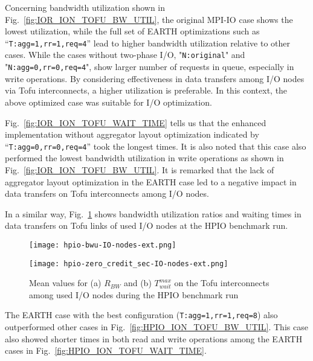 \documentclass{jhps}
\begin{document}
Concerning bandwidth utilization shown in
Fig.~\ref{fig:IOR_ION_TOFU_BW_UTIL},
the original MPI-IO case shows the lowest utilization, while the full set of EARTH 
optimizations such as “{\tt T:agg=1,rr=1,req=4}” lead to higher bandwidth utilization
relative to other cases.
While the cases without two-phase I/O,
"{\tt N:original}" and "{\tt N:agg=0,rr=0,req=4}", show
larger number of requests in queue, especially in write operations.
By considering effectiveness in data transfers among I/O nodes via Tofu interconnects,
a higher utilization is preferable.
In this context, the above optimized case was suitable for I/O optimization.

Fig.~\ref{fig:IOR_ION_TOFU_WAIT_TIME}
tells us that the enhanced implementation
without aggregator layout optimization indicated by “{\tt T:agg=0,rr=0,req=4}”
took the longest times.
It is also noted that this case also performed the lowest bandwidth utilization
in write operations as shown in
Fig.~\ref{fig:IOR_ION_TOFU_BW_UTIL}.
It is remarked that the lack of aggregator layout optimization in the EARTH case
led to a negative impact in data transfers on Tofu interconnects among I/O nodes.

In a similar way, Fig.~\ref{fig:HPIO_ION_TOFU_BWU_WAIT_TIME} shows
bandwidth utilization ratios and waiting times in data transfers
on Tofu links of used I/O nodes at the HPIO benchmark run.
%
\begin{figure}[tb]
\centering
\begin{minipage}[t]{0.48\textwidth}
 \centering
 \texttt{[image: hpio-bwu-IO-nodes-ext.png]}
 \label{fig:HPIO_ION_TOFU_BW_UTIL}
\end{minipage}
%
\noindent
\begin{minipage}[t]{0.48\textwidth}
 \centering
 \texttt{[image: hpio-zero\_credit\_sec-IO-nodes-ext.png]}
 \label{fig:HPIO_ION_TOFU_WAIT_TIME}
\end{minipage}
\caption{Mean values for (a) $R_{BW}$ and (b) $T_{wait}^{max}$ on the Tofu interconnects
among used I/O nodes during the HPIO benchmark run}
\label{fig:HPIO_ION_TOFU_BWU_WAIT_TIME}
\end{figure}
%
The EARTH case with the best configuration ({\tt T:agg=1,rr=1,req=8}) also
outperformed other cases in
Fig.~\ref{fig:HPIO_ION_TOFU_BW_UTIL}.
This case also showed shorter times in both read and write operations
among the EARTH cases in
Fig.~\ref{fig:HPIO_ION_TOFU_WAIT_TIME}.
\end{document}

